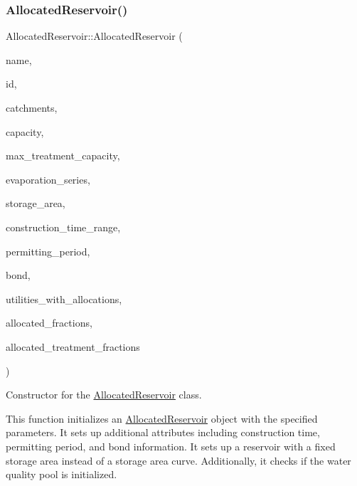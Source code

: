 \subsubsection{\texorpdfstring{Allocated\+Reservoir()}{AllocatedReservoir()}\hspace{0.1cm}{\footnotesize\ttfamily [4/5]}}
{\footnotesize\ttfamily Allocated\+Reservoir\+::\+Allocated\+Reservoir (\begin{DoxyParamCaption}\item[{const char $\ast$}]{name,  }\item[{const int}]{id,  }\item[{const vector$<$ \mbox{\hyperlink{classCatchment}{Catchment}} $\ast$$>$ \&}]{catchments,  }\item[{const double}]{capacity,  }\item[{const double}]{max\+\_\+treatment\+\_\+capacity,  }\item[{\mbox{\hyperlink{classEvaporationSeries}{Evaporation\+Series}} \&}]{evaporation\+\_\+series,  }\item[{double}]{storage\+\_\+area,  }\item[{const vector$<$ double $>$ \&}]{construction\+\_\+time\+\_\+range,  }\item[{double}]{permitting\+\_\+period,  }\item[{\mbox{\hyperlink{classBond}{Bond}} \&}]{bond,  }\item[{vector$<$ int $>$ $\ast$}]{utilities\+\_\+with\+\_\+allocations,  }\item[{vector$<$ double $>$ $\ast$}]{allocated\+\_\+fractions,  }\item[{vector$<$ double $>$ $\ast$}]{allocated\+\_\+treatment\+\_\+fractions }\end{DoxyParamCaption})}



Constructor for the \mbox{\hyperlink{classAllocatedReservoir}{Allocated\+Reservoir}} class. 

This function initializes an \mbox{\hyperlink{classAllocatedReservoir}{Allocated\+Reservoir}} object with the specified parameters. It sets up additional attributes including construction time, permitting period, and bond information. It sets up a reservoir with a fixed storage area instead of a storage area curve. Additionally, it checks if the water quality pool is initialized.



